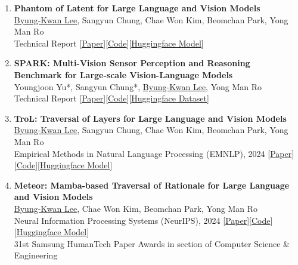 \documentclass[a4paper,11pt]{article}
\begin{document}
{\begin{enumerate}[leftmargin=2.2em, labelsep=0.6em, align=left, itemindent=0em, label={\color{accentDark}\textbf{\arabic*.}}]
\item \textbf{Phantom of Latent for Large Language and Vision Models}
\\\vspace{1mm}\underline{Byung-Kwan Lee}, Sangyun Chung, Chae Won Kim, Beomchan Park, Yong Man Ro
\\\vspace{2mm}Technical Report [\href{https://arxiv.org/abs/2409.14713}{Paper}][\href{https://github.com/ByungKwanLee/Phantom}{Code}][\href{https://huggingface.co/collections/BK-Lee/phantom-66f1368c1f47e626066263c0}{Huggingface Model}]

\item \textbf{SPARK: Multi-Vision Sensor Perception and Reasoning Benchmark for Large-scale Vision-Language Models}
\\\vspace{1mm}Youngjoon Yu*, Sangyun Chung*, \underline{Byung-Kwan Lee}, Yong Man Ro
\\\vspace{2mm}Technical Report [\href{https://arxiv.org/abs/2408.12114}{Paper}][\href{https://github.com/top-yun/SPARK}{Code}][\href{https://huggingface.co/datasets/topyun/SPARK}{Huggingface Dataset}]

\item \textbf{TroL: Traversal of Layers for Large Language and Vision Models}
\\\vspace{1mm}\underline{Byung-Kwan Lee}, Sangyun Chung, Chae Won Kim, Beomchan Park, Yong Man Ro
\\\vspace{2mm}Empirical Methods in Natural Language Processing (EMNLP), 2024 [\href{https://arxiv.org/abs/2406.12246}{Paper}][\href{https://github.com/ByungKwanLee/TroL}{Code}][\href{https://huggingface.co/collections/BK-Lee/trol-6671374e78e410e0f8cb5ef8}{Huggingface Model}]

\item \textbf{Meteor: Mamba-based Traversal of Rationale for Large Language and Vision Models}
\\\vspace{1mm}\underline{Byung-Kwan Lee}, Chae Won Kim, Beomchan Park, Yong Man Ro
\\\vspace{2mm}Neural Information Processing Systems (NeurIPS), 2024 [\href{https://arxiv.org/abs/2405.15574}{Paper}][\href{https://github.com/ByungKwanLee/Meteor}{Code}][\href{https://huggingface.co/collections/BK-Lee/meteor-66561614b88e4539b263f8a0}{Huggingface Model}]
\\\vspace{2mm}31st Samsung HumanTech Paper Awards in section of Computer Science \& Engineering


\end{enumerate}}
\end{document}

